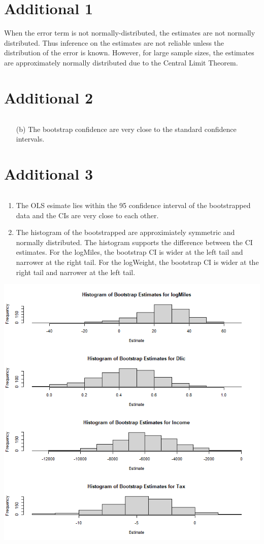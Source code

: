 \documentclass{article}
\begin{document}
\section{Additional 1}

When the error term is not normally-distributed, the estimates are not normally distributed. Thus inference on the estimates are not reliable unless the distribution of the error is known. However, for large sample sizes, the estimates are approximately normally distributed due to the Central Limit Theorem.

\newpage
\section {Additional 2}
\inputminted{r}{q4.r}

\begin{enumerate}[label=(\alph*)]
\item[(b)] The bootstrap confidence are very close to the standard confidence intervals.
\end{enumerate}
\newpage
\section {Additional 3}
\inputminted{r}{q5.r}


\begin{enumerate}[label=(\alph*)]
\item The OLS esimate lies within the 95 confidence interval of the bootstrapped data and the CIs are very close to each other.
\item The histogram of the bootstrapped are approximiately symmetric and normally distributed. The histogram supports the difference between the CI estimates. For the logMiles, the bootstrap CI is wider at the left tail and narrower at the right tail. For the logWeight, the bootstrap CI is wider at the right tail and narrower at the left tail.
\end{enumerate}

\includegraphics[scale=0.5]{q5.png}
\end{document}
